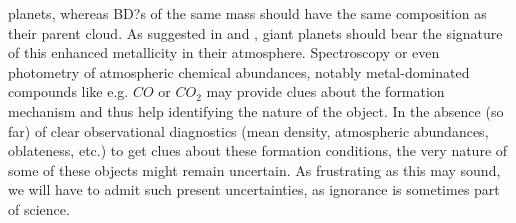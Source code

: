 planets, whereas BD?s of the same mass should have the same composition as their parent cloud. As suggested in
\cite{Chabrier2007} and \citep{Fortney2008}, giant planets should bear the signature of
this enhanced metallicity in their atmosphere. Spectroscopy or even photometry of atmospheric chemical abundances,
notably metal-dominated compounds like e.g. $CO$ or $CO_2$ may provide clues about the formation mechanism and thus
help identifying the nature of the object. In the absence (so far) of clear observational diagnostics (mean density, 
atmospheric abundances, oblateness, etc.) to get clues about these formation conditions, the very nature of some of these
objects might remain uncertain. As frustrating as this may sound, we will have to admit such present uncertainties, as
ignorance is sometimes part of science.